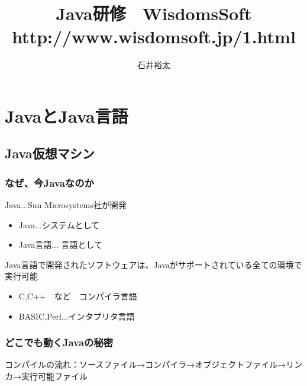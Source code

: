 \documentclass[12pt,a4j,twoside]{jsbook}
\title{
{\Large Java研修　WisdomsSoft\\}
{\small http://www.wisdomsoft.jp/1.html}
}
\author{石井裕太}
\begin{document}
\maketitle
\thispagestyle{empty}
\vspace*{3cm}
\tableofcontents
\clearpage
\renewcommand{\thepage}{\roman{page}}


\clearpage
\chapter{JavaとJava言語}
\section{Java仮想マシン}
\subsection{なぜ、今Javaなのか}

Java...Sun Microsystems社が開発

\begin{itemize}
    \item Java...システムとして
    \item Java言語... 言語として
\end{itemize}
Java言語で開発されたソフトウェアは、Javaがサポートされている全ての環境で実行可能
\begin{itemize}
    \item C,C++　など　コンパイラ言語
    \item BASIC,Perl...インタプリタ言語
\end{itemize}
\subsection{どこでも動くJavaの秘密}
コンパイルの流れ：ソースファイル→コンパイラ→オブジェクトファイル→リンカ→実行可能ファイル
\end{document}
